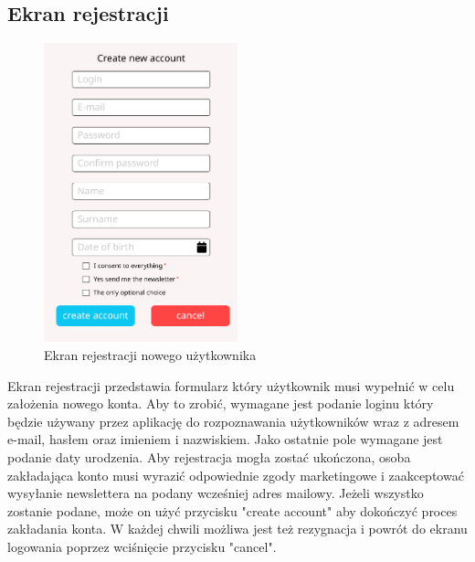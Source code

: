 \subsection{Ekran rejestracji}
\begin{figure}[H]
    \centering
    \includegraphics[width=0.5\textwidth]{img/4/rejestracja.png}
    \caption{Ekran rejestracji nowego użytkownika}
    \label{fig:proj-wstepny-ekran-rejestracji}
\end{figure}

Ekran rejestracji przedstawia formularz który użytkownik musi wypełnić w celu założenia nowego konta. Aby to zrobić, wymagane jest podanie loginu który będzie używany przez aplikację do rozpoznawania użytkowników wraz z adresem e-mail, hasłem oraz imieniem i nazwiskiem. Jako ostatnie pole wymagane jest podanie daty urodzenia.
Aby rejestracja mogła zostać ukończona, osoba zakładająca konto musi wyrazić odpowiednie zgody marketingowe i zaakceptować wysyłanie newslettera na podany wcześniej adres mailowy. Jeżeli wszystko zostanie podane, może on użyć przycisku "create account" aby dokończyć proces zakładania konta. W każdej chwili możliwa jest też rezygnacja i powrót do ekranu logowania poprzez wciśnięcie przycisku "cancel".

